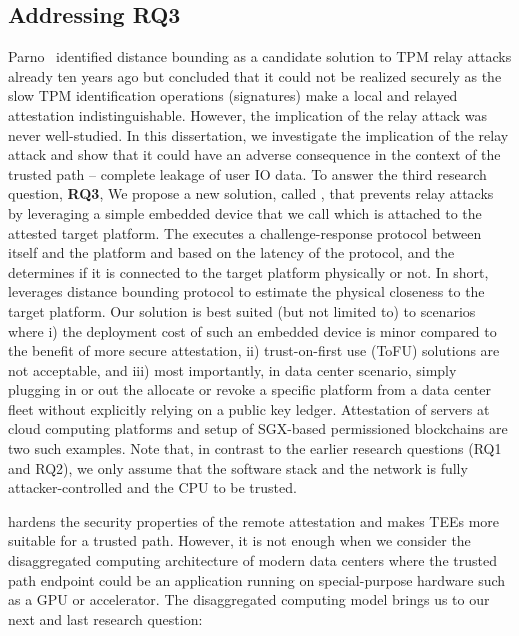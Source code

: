     \subsection{Addressing RQ3}

Parno~\cite{parno2008bootstrapping} identified distance bounding as a candidate solution to TPM relay attacks already ten years ago but concluded that it could not be realized securely as the slow TPM identification operations (signatures) make a local and relayed attestation indistinguishable. However, the implication of the relay attack was never well-studied. In this dissertation, we investigate the implication of the relay attack and show that it could have an adverse consequence in the context of the trusted path -- complete leakage of user IO data. To answer the third research question, \textbf{RQ3},  We propose a new solution, called \proximitee, that prevents relay attacks by leveraging a simple embedded device that we call \deviceproximitee which is attached to the attested target platform. The \deviceproximitee executes a challenge-response protocol between itself and the platform and based on the latency of the protocol, and the \deviceproximitee determines if it is connected to the target platform physically or not. In short, \deviceproximitee leverages distance bounding protocol to estimate the physical closeness to the target platform. Our solution is best suited (but not limited to) to scenarios where i) the deployment cost of such an embedded device is minor compared to the benefit of more secure attestation, ii) trust-on-first use (ToFU) solutions are not acceptable, and iii) most importantly, in data center scenario, simply plugging in or out the \deviceproximitee allocate or revoke a specific platform from a data center fleet without explicitly relying on a public key ledger. Attestation of servers at cloud computing platforms and setup of SGX-based permissioned blockchains are two such examples. Note that, in contrast to the earlier research questions (RQ1 and RQ2), we only assume that the software stack and the network is fully attacker-controlled and the CPU to be trusted.



\proximitee hardens the security properties of the remote attestation and makes TEEs more suitable for a trusted path. However, it is not enough when we consider the disaggregated computing architecture of modern data centers where the trusted path endpoint could be an application running on special-purpose hardware such as a GPU or accelerator. The disaggregated computing model brings us to our next and last research question:  
    
